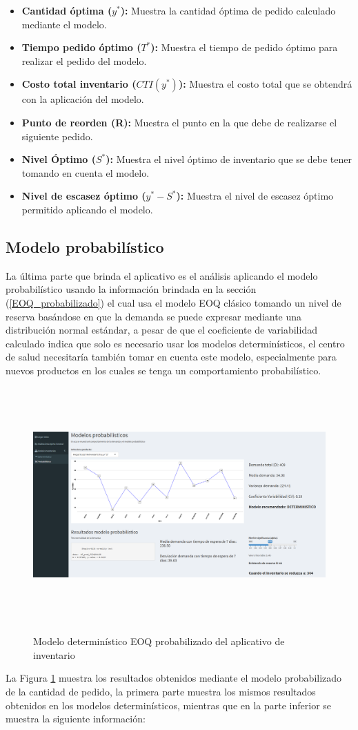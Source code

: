 \begin{itemize}
   \item \textbf{Cantidad óptima ($y^*$):} Muestra la cantidad óptima de pedido calculado mediante el modelo.
  \item \textbf{Tiempo pedido óptimo ($T^*$):} Muestra el tiempo de pedido óptimo para realizar el pedido del modelo.
  \item \textbf{Costo total inventario ($CTI(y^*)$):} Muestra el costo total que se obtendrá con la aplicación del modelo.
  \item \textbf{Punto de reorden (R):} Muestra el punto en la que debe de realizarse el siguiente pedido.
  \item \textbf{Nivel Óptimo ($S^*$):} Muestra el nivel óptimo de inventario que se debe tener tomando en cuenta el modelo.
  \item \textbf{Nivel de escasez óptimo ($y^* - S^*$):} Muestra el nivel de escasez óptimo permitido aplicando el modelo.
\end{itemize}

\subsection{Modelo probabilístico}
La última parte que brinda el aplicativo es el análisis aplicando el modelo probabilístico usando la información brindada en la sección (\ref{EOQ_probabilizado}) el cual usa el modelo EOQ clásico tomando un nivel de reserva basándose en que la demanda se puede expresar mediante una distribución normal estándar, a pesar de que el coeficiente de variabilidad calculado indica que solo es necesario usar los modelos determinísticos, el centro de salud necesitaría también tomar en cuenta este modelo, especialmente para nuevos productos en los cuales se tenga un comportamiento probabilístico.

\begin{figure}[H]
  \caption{Modelo determinístico EOQ probabilizado del aplicativo de inventario}
  {\includegraphics[width=16cm, height=9cm]{images/Shiny8.png}}
  \label{fig:Shiny8}
\end{figure}
\clearpage
La Figura \ref{fig:Shiny8} muestra los resultados obtenidos mediante el modelo probabilizado de la cantidad de pedido, la primera parte muestra los mismos resultados obtenidos en los modelos determinísticos, mientras que en la parte inferior se muestra la siguiente información:

